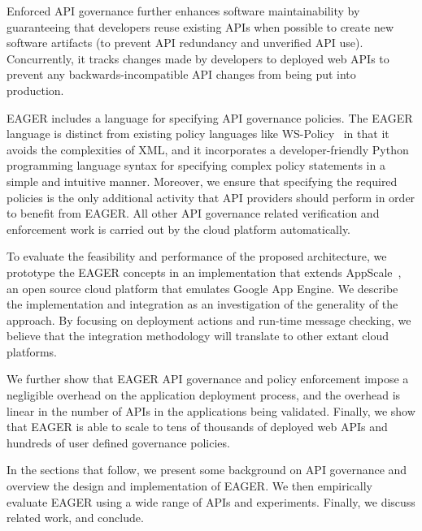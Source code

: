 Enforced API governance further enhances software maintainability by guaranteeing that 
developers reuse existing APIs when possible to create new software artifacts
(to prevent API redundancy and unverified API use). Concurrently, it
tracks changes made by developers to deployed web APIs to prevent
any backwards-incompatible API changes from being put into production.

EAGER includes a language for specifying 
API governance policies.  The EAGER language is distinct from 
existing policy languages like WS-Policy~\cite{WSPolicy,soagovstandard}
in that it avoids the complexities of XML, 
and it incorporates a developer-friendly Python programming language syntax for 
specifying complex policy statements in a simple and 
intuitive manner. Moreover, we ensure that specifying the required policies 
is the only additional activity that API providers should perform in
order to benefit from EAGER. All other API governance related verification and 
enforcement work is carried out by the cloud platform automatically.

To evaluate the feasibility and performance of the proposed 
architecture, we prototype the EAGER concepts in an implementation
that extends AppScale~\cite{appscale13}, 
an open source
cloud platform that emulates Google App Engine. We describe
the implementation and integration as an investigation of
the generality of the approach.  By focusing on deployment actions and
run-time message checking, we believe that the integration methodology
will translate to other extant cloud platforms.


We further show that 
EAGER API governance and policy enforcement impose a negligible 
overhead on the application deployment process, and the overhead
is linear in the number of APIs in the applications 
being validated.  
Finally, we show that EAGER is able to
scale to tens of thousands of deployed web APIs and hundreds of user 
defined governance policies.

In the sections that follow, we present some background on API governance
and overview the design and implementation of
EAGER. We then empirically evaluate EAGER using a wide range of APIs and
experiments.  Finally, we discuss related work, and conclude.
